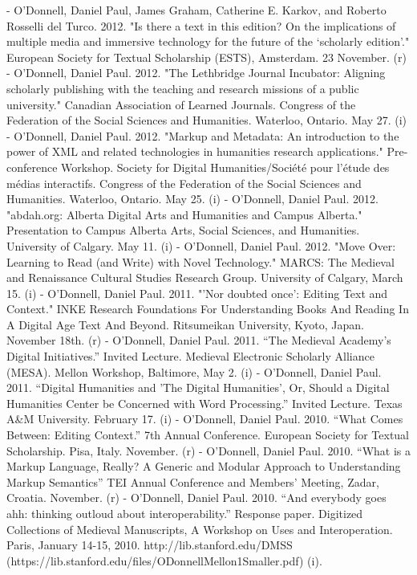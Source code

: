 - O'Donnell, Daniel Paul, James Graham, Catherine E. Karkov, and Roberto Rosselli del Turco. 2012. "Is there a text in this edition? On the implications of multiple media and immersive technology for the future of the ‘scholarly edition’." European Society for Textual Scholarship (ESTS), Amsterdam. 23 November. (r)
- O'Donnell, Daniel Paul. 2012. "The Lethbridge Journal Incubator: Aligning scholarly publishing with the teaching and research missions of a public university." Canadian Association of Learned Journals. Congress of the Federation of the Social Sciences and Humanities. Waterloo, Ontario. May 27. (i)
- O'Donnell, Daniel Paul. 2012. "Markup and Metadata: An introduction to the power of XML and related technologies in humanities research applications." Pre-conference Workshop. Society for Digital Humanities/\allowbreak{}Société pour l’étude des médias interactifs. Congress of the Federation of the Social Sciences and Humanities. Waterloo, Ontario. May 25. (i)
- O'Donnell, Daniel Paul. 2012. "abdah.org: Alberta Digital Arts and Humanities and Campus Alberta." Presentation to Campus Alberta Arts, Social Sciences, and Humanities. University of Calgary. May 11. (i)
- O'Donnell, Daniel Paul. 2012. "Move Over: Learning to Read (and Write) with Novel Technology." MARCS: The Medieval and Renaissance Cultural Studies Research Group. University of  Calgary, March 15. (i)
- O'Donnell, Daniel Paul. 2011. "'Nor doubted once': Editing Text and Context." INKE Research Foundations For Understanding Books And Reading In A Digital Age Text And Beyond. Ritsumeikan University, Kyoto, Japan. November 18th. (r)
- O'Donnell, Daniel Paul. 2011. “The Medieval Academy's Digital Initiatives.” Invited Lecture. Medieval Electronic Scholarly Alliance (MESA). Mellon Workshop, Baltimore, May 2. (i)
- O'Donnell, Daniel Paul. 2011. “Digital Humanities and 'The Digital Humanities', Or, Should a Digital Humanities Center be Concerned with Word Processing.” Invited Lecture. Texas A&M University. February 17. (i)
- O'Donnell, Daniel Paul. 2010. “What Comes Between: Editing Context.” 7th Annual Conference. European Society for Textual Scholarship. Pisa, Italy. November. (r)
- O'Donnell, Daniel Paul. 2010. “What is a Markup Language, Really? A Generic and Modular Approach to Understanding Markup Semantics” TEI Annual Conference and Members' Meeting, Zadar, Croatia. November. (r)
- O'Donnell, Daniel Paul. 2010. “And everybody goes ahh: thinking outloud about interoperability.” Response paper. Digitized Collections of Medieval Manuscripts, A Workshop on Uses and Interoperation. Paris, January 14-15, 2010. http:/\allowbreak{}/\allowbreak{}lib.stanford.edu/\allowbreak{}DMSS (https:/\allowbreak{}/\allowbreak{}lib.stanford.edu/\allowbreak{}files/\allowbreak{}ODonnellMellon1Smaller.pdf) (i).
